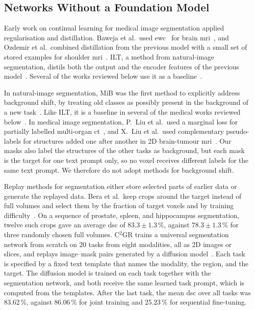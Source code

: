 \subsection{Networks Without a Foundation Model}
\label{subsec:cl-medseg-net}

Early work on continual learning for medical image segmentation applied regularisation and distillation.
Baweja et al.\ used \gls{ewc}~\cite{Kirkpatrick_2017} for brain \gls{mri}~\cite{baweja2018continuallearningmedicalimaging}, and Ozdemir et al.\ combined distillation from the previous model with a small set of stored examples for shoulder \gls{mri}~\cite{Ozdemir_2018}.
ILT, a method from natural-image segmentation, distils both the output and the encoder features of the previous model~\cite{michieli2019incrementallearningtechniquessemantic}.
Several of the works reviewed below use it as a baseline~\cite{ji2023continualsegmentsingleunified,zhang2023continuallearningabdominalmultiorgan}.

In natural-image segmentation, MiB was the first method to explicitly address background shift, by treating old classes as possibly present in the background of a new task~\cite{cermelli2020modelingbackgroundincrementallearning}.
Like ILT, it is a baseline in several of the medical works reviewed below~\cite{ji2023continualsegmentsingleunified,gonzalez2023lifelong}.
In medical image segmentation, P.~Liu et al.\ used a marginal loss for partially labelled multi-organ \gls{ct}~\cite{liu2022learningincrementallysegmentmultiple}, and X.~Liu et al.\ used complementary pseudo-labels for structures added one after another in 2D brain-tumour \gls{mri}~\cite{liu2023incrementallearningheterogeneousstructure}.
Our masks also label the structures of the other tasks as background, but each mask is the target for one text prompt only, so no voxel receives different labels for the same text prompt.
We therefore do not adopt methods for background shift.

Replay methods for segmentation either store selected parts of earlier data or generate the replayed data.
Bera et al.\ keep crops around the target instead of full volumes and select them by the fraction of target voxels and by training difficulty~\cite{memory_replay_cropping}.
On a sequence of prostate, spleen, and hippocampus segmentation, twelve such crops gave an average \gls{dsc} of $83.3 \pm 1.3$\,\%, against $78.3 \pm 1.3$\,\% for three randomly chosen full volumes.
C$^2$GR trains a universal segmentation network from scratch on 20 tasks from eight modalities, all as 2D images or slices, and replays image--mask pairs generated by a diffusion model~\cite{li2026c2gr}.
Each task is specified by a fixed text template that names the modality, the region, and the target.
The diffusion model is trained on each task together with the segmentation network, and both receive the same learned task prompt, which is computed from the templates.
After the last task, the mean \gls{dsc} over all tasks was 83.62\,\%, against 86.06\,\% for joint training and 25.23\,\% for sequential fine-tuning.


